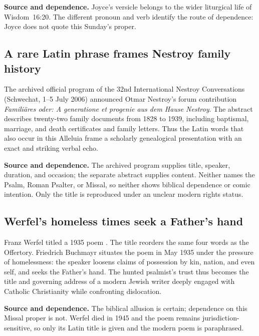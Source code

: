 \textbf{Source and dependence.} Joyce's versicle belongs to the wider liturgical life of Wisdom~16:20.
The different pronoun and verb identify the route of dependence: Joyce does
not quote this Sunday's proper.

\subsection*{A rare Latin phrase frames Nestroy family history\enspace{}}

The archived official program of the 32nd International Nestroy Conversations
(Schwechat, 1--5 July 2006) announced Otmar Nestroy's forum contribution
\emph{Familiäres oder: A generatione et progenie aus dem Hause Nestroy}.
The abstract describes twenty-two family documents from 1828 to 1939,
including baptismal, marriage, and death certificates and family letters.
Thus the Latin words that also occur in this Alleluia frame a scholarly
genealogical presentation with an exact and striking verbal echo.

\textbf{Source and dependence.} The archived program supplies title, speaker, duration, and
occasion; the separate abstract supplies content. Neither names the Psalm,
Roman Psalter, or Missal, so neither shows biblical dependence or comic
intention. Only the title is reproduced under an unclear modern rights status.

\subsection*{Werfel's homeless times seek a Father's hand\enspace{}}

Franz Werfel titled a 1935 poem . The title
reorders the same four words as the Offertory. Friedrich Buchmayr situates the
poem in May 1935 under the pressure of homelessness: the speaker loosens claims
of possession by kin, nation, and even self, and seeks the Father's hand.
The hunted psalmist's trust thus becomes the title and governing address of a
modern Jewish writer deeply engaged with Catholic Christianity while
confronting dislocation.

\textbf{Source and dependence.} The biblical allusion is certain; dependence on this Missal
proper is not. Werfel died in 1945 and the poem remains jurisdiction-sensitive,
so only its Latin title is given and the modern poem is paraphrased.
